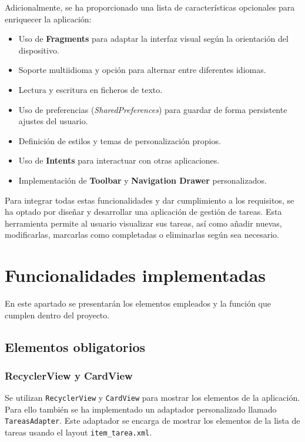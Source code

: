 \documentclass{article}
\begin{document}
Adicionalmente, se ha proporcionado una lista de características opcionales para enriquecer la aplicación:

\begin{itemize}
    \item Uso de \textbf{Fragments} para adaptar la interfaz visual según la orientación del dispositivo.
    \item Soporte multiidioma y opción para alternar entre diferentes idiomas.
    \item Lectura y escritura en ficheros de texto.
    \item Uso de preferencias (\textit{SharedPreferences}) para guardar de forma persistente ajustes del usuario.
    \item Definición de estilos y temas de personalización propios.
    \item Uso de \textbf{Intents} para interactuar con otras aplicaciones.
    \item Implementación de \textbf{Toolbar} y \textbf{Navigation Drawer} personalizados.
\end{itemize}

Para integrar todas estas funcionalidades y dar cumplimiento a los requisitos, se ha optado por diseñar y desarrollar una aplicación de gestión de tareas. Esta herramienta permite al usuario visualizar sus tareas, así como añadir nuevas, modificarlas, marcarlas como completadas o eliminarlas según sea necesario.

\section{Funcionalidades implementadas}

En este apartado se presentarán los elementos empleados y la función que cumplen dentro del proyecto.

\subsection{Elementos obligatorios}

\subsubsection{RecyclerView y CardView}

Se utilizan \texttt{RecyclerView} y \texttt{CardView} para mostrar los elementos de la aplicación. Para ello también se ha implementado un adaptador personalizado llamado \texttt{TareasAdapter}. Este adaptador se encarga de mostrar los elementos de la lista de tareas usando el layout \texttt{item\_tarea.xml}.
\end{document}
